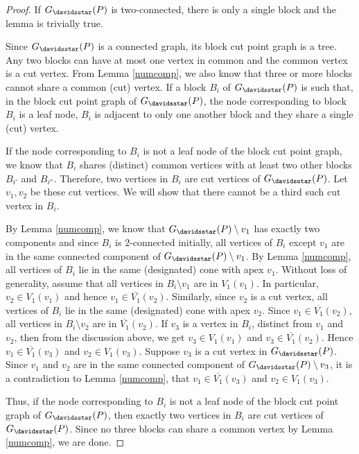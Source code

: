 \begin{proof}
If $G_{\davidsstar}(P)$ is two-connected, there is only a single block and the lemma is trivially true. 

Since $G_{\davidsstar}(P)$ is a connected graph, its block cut point graph is a tree. Any two blocks can have at most one vertex in common and the 
common vertex is a cut vertex. From Lemma \ref{numcomp}, we also know that three or more blocks cannot share a common (cut) vertex. If a block $B_i$ 
of $G_{\davidsstar}(P)$ is such that, in the block cut point graph of $G_{\davidsstar}(P)$, the node corresponding to block $B_i$ is a leaf node, 
$B_i$ is adjacent to only one another block and they share a single (cut) vertex. 

If the node corresponding to $B_i$ is not a leaf node of the block cut point graph, we know that $B_i$ shares (distinct) common vertices with at least 
two other blocks $B_{i'}$ and $B_{i''}$. Therefore, two vertices in $B_i$ are cut vertices of $G_{\davidsstar}(P)$. Let $v_1, v_2$ be these cut vertices. 
We will show that there cannot be a third such cut vertex in $B_i$.

By Lemma \ref{numcomp}, we know that $G_{\davidsstar}(P) \setminus v_1$ has exactly two components and since $B_i$ is $2$-connected initially, all vertices 
of $B_i$ except $v_1$ are in the same connected component of $G_{\davidsstar}(P) \setminus v_1$. By Lemma \ref{numcomp}, all vertices of $B_i$ lie in the 
same (designated) cone with apex $v_1$. Without loss of generality, assume that all vertices in $B_i \setminus v_1$ are in $V_1(v_1)$. In particular, 
$v_2 \in V_1(v_1)$ and hence $v_1 \in \overline{V_1}(v_2)$. Similarly, since $v_2$ is a cut vertex, all vertices of $B_i$ lie in the same (designated) 
cone with apex $v_2$. Since $v_1 \in \overline{V_1}(v_2)$, all vertices in $B_i \setminus v_2$ are in $\overline{V_1}(v_2)$. If $v_3$ is a vertex in 
$B_i$, distinct from $v_1$ and $v_2$, then from the discussion above, we get $v_3 \in V_1(v_1)$ and $v_3 \in \overline {V_1}(v_2)$. 
Hence $v_1 \in \overline{V_1}(v_3)$ and $v_2 \in V_1(v_3)$. Suppose $v_3$ is a cut vertex in $G_{\davidsstar}(P)$. Since $v_1$ and 
$v_2$ are in the same connected component of $G_{\davidsstar}(P) \setminus v_3$, it is a contradiction to Lemma \ref{numcomp}, that 
$v_1 \in \overline{V_1}(v_3)$ and $v_2 \in {V_1}(v_3)$. 

Thus, if the node corresponding to $B_i$ is not a leaf node of the block cut point graph of $G_{\davidsstar}(P)$, then exactly two vertices in 
$B_i$ are cut vertices of $G_{\davidsstar}(P)$. Since no three blocks can share a common vertex by Lemma \ref{numcomp}, we are done.
\end{proof}

